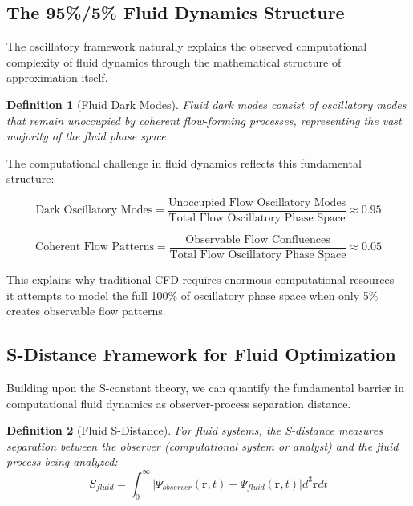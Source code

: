 \documentclass[12pt,a4paper]{article}
\newtheorem{definition}{Definition}
\begin{document}
\subsection{The 95\%/5\% Fluid Dynamics Structure}

The oscillatory framework naturally explains the observed computational complexity of fluid dynamics through the mathematical structure of approximation itself.

\begin{definition}[Fluid Dark Modes]
Fluid dark modes consist of oscillatory modes that remain unoccupied by coherent flow-forming processes, representing the vast majority of the fluid phase space.
\end{definition}

The computational challenge in fluid dynamics reflects this fundamental structure:

\begin{equation}
\text{Dark Oscillatory Modes} = \frac{\text{Unoccupied Flow Oscillatory Modes}}{\text{Total Flow Oscillatory Phase Space}} \approx 0.95
\end{equation}

\begin{equation}
\text{Coherent Flow Patterns} = \frac{\text{Observable Flow Confluences}}{\text{Total Flow Oscillatory Phase Space}} \approx 0.05
\end{equation}

This explains why traditional CFD requires enormous computational resources - it attempts to model the full 100\% of oscillatory phase space when only 5\% creates observable flow patterns.

\subsection{S-Distance Framework for Fluid Optimization}

Building upon the S-constant theory, we can quantify the fundamental barrier in computational fluid dynamics as observer-process separation distance.

\begin{definition}[Fluid S-Distance]
For fluid systems, the S-distance measures separation between the observer (computational system or analyst) and the fluid process being analyzed:
\begin{equation}
S_{fluid} = \int_0^{\infty} |\Psi_{observer}(\mathbf{r}, t) - \Psi_{fluid}(\mathbf{r}, t)| d^3\mathbf{r} dt
\end{equation}
\end{definition}
\end{document}
